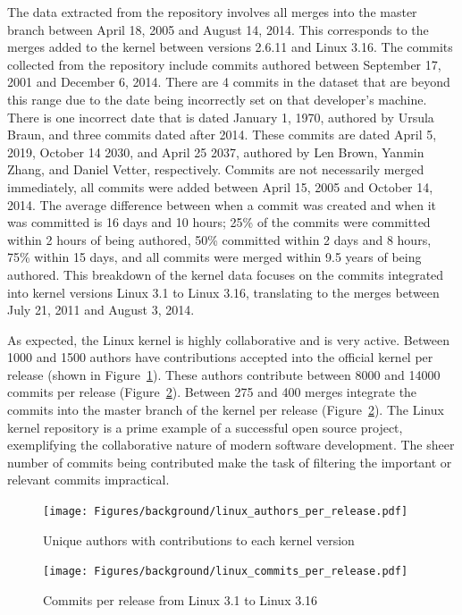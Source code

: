 The data extracted from the repository involves all merges into the
master branch between April 18, 2005 and August 14, 2014. This
corresponds to the merges added to the kernel between versions 2.6.11
and Linux 3.16. The commits collected from the repository include
commits authored between September 17, 2001 and December 6, 2014. There
are 4 commits in the dataset that are beyond this range due to the date
being incorrectly set on that developer's machine. There is one
incorrect date that is dated January 1, 1970, authored by Ursula Braun,
and three commits dated after 2014. These commits are dated April 5,
2019, October 14 2030, and April 25 2037, authored by Len Brown, Yanmin
Zhang, and Daniel Vetter, respectively. Commits are not necessarily
merged immediately, all commits were added between April 15, 2005 and
October 14, 2014. The average difference between when a commit was
created and when it was committed is 16 days and 10 hours; 25\% of the
commits were committed within 2 hours of being authored, 50\% committed
within 2 days and 8 hours, 75\% within 15 days, and all commits were
merged within 9.5 years of being authored. This breakdown of the kernel
data focuses on the commits integrated into kernel versions Linux 3.1 to
Linux 3.16, translating to the merges between July 21, 2011 and August
3, 2014.

As expected, the Linux kernel is highly collaborative and is very
active. Between 1000 and 1500 authors have contributions accepted into
the official kernel per release (shown in
Figure~\ref{fig:linux_authors_per_release}). These authors contribute
between 8000 and 14000 commits per release
(Figure~\ref{fig:linux_commits_per_release}). Between 275 and 400 merges
integrate the commits into the master branch of the kernel per release
(Figure~\ref{fig:linux_commits_per_release}). The Linux kernel
repository is a prime example of a successful open source project,
exemplifying the collaborative nature of modern software development.
The sheer number of commits being contributed make the task of filtering
the important or relevant commits impractical.

\begin{figure}[htpb]
  \centering
  \texttt{[image: Figures/background/linux\_authors\_per\_release.pdf]}
  \caption{Unique authors with contributions to each kernel version}
  \label{fig:linux_authors_per_release}
\end{figure}

\begin{figure}[htpb]
  \centering
  \texttt{[image: Figures/background/linux\_commits\_per\_release.pdf]}
  \caption{Commits per release from Linux 3.1 to Linux 3.16}
  \label{fig:linux_commits_per_release}
\end{figure}

